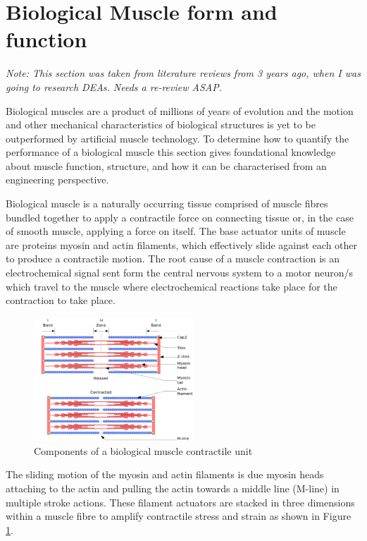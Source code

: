 




\section{Biological Muscle form and function}
\textit{Note: This section was taken from literature reviews from 3 years ago, when I was going to research DEAs. Needs a re-review ASAP.}

Biological muscles are a product of millions of years of evolution and the motion and other mechanical characteristics of biological structures is yet to be outperformed by artificial muscle technology. To determine how to quantify the performance of a biological muscle this section gives foundational knowledge about muscle function, structure, and how it can be characterised from an engineering perspective. 

Biological muscle is a naturally occurring tissue comprised of muscle fibres bundled together to apply a contractile force on connecting tissue or, in the case of smooth muscle, applying a force on itself. The base actuator units of muscle are proteins myosin and actin filaments, which effectively slide against each other to produce a contractile motion. The root cause of a muscle contraction is an electrochemical signal sent form the central nervous system to a motor neuron/s which travel to the muscle where electrochemical reactions take place for the contraction to take place.
\begin{figure}[h!]
  \centering
  \includegraphics[width=6cm]{Figures/300px-Sarcomere.png}
  \caption{Components of a biological muscle contractile unit \citep{Richfield2014}}
  \label{fig:muscle_unit}
\end{figure}
The sliding motion of the myosin and actin filaments is due myosin heads attaching to the actin and pulling the actin towards a middle line (M-line) in multiple stroke actions. These filament actuators are stacked in three dimensions within a muscle fibre to amplify contractile stress and strain as shown in Figure \ref{fig:muscle_unit}.


